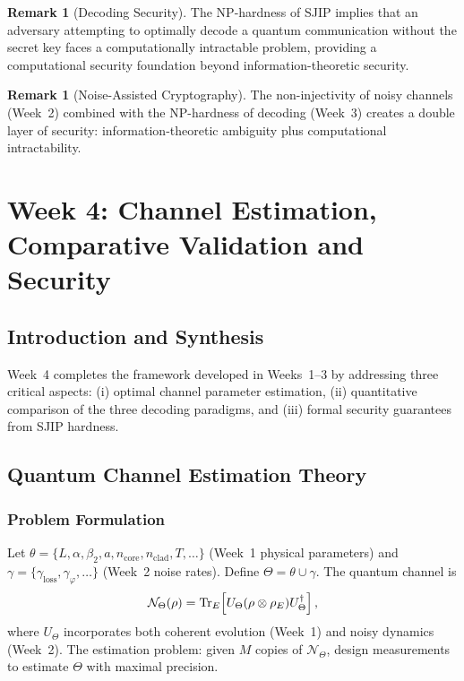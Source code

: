 \documentclass[12pt,a4paper]{article}
\theoremstyle{definition}
\newtheorem{remark}[definition]{Remark}
\theoremstyle{plain}
\newcommand{\tensor}{\otimes}
\begin{document}
\begin{remark}[Decoding Security]
The NP-hardness of SJIP implies that an adversary attempting to optimally decode a
quantum communication without the secret key faces a computationally intractable
problem, providing a computational security foundation beyond information-theoretic
security.
\end{remark}

\begin{remark}[Noise-Assisted Cryptography]
The non-injectivity of noisy channels (Week~2) combined with the NP-hardness of
decoding (Week~3) creates a double layer of security: information-theoretic ambiguity
plus computational intractability.
\end{remark}

\section{Week 4: Channel Estimation, Comparative Validation and Security}

\subsection{Introduction and Synthesis}

Week~4 completes the framework developed in Weeks~1--3 by addressing three critical
aspects: (i) optimal channel parameter estimation, (ii) quantitative comparison of the
three decoding paradigms, and (iii) formal security guarantees from SJIP hardness.

\subsection{Quantum Channel Estimation Theory}
\label{sec:week4_estimation}

\subsubsection{Problem Formulation}

Let $\theta=\{L,\alpha,\beta_2,a,n_{\mathrm{core}},n_{\mathrm{clad}},T,\dots\}$ (Week~1
physical parameters) and $\gamma=\{\gamma_{\mathrm{loss}},\gamma_\varphi,\dots\}$ (Week~2
noise rates). Define $\Theta=\theta\cup\gamma$. The quantum channel is
\begin{equation}
\mathcal{N}_\Theta(\rho)=\Tr_E\!\left[U_\Theta(\rho\tensor\rho_E)U_\Theta^\dagger\right],
\end{equation}
where $U_\Theta$ incorporates both coherent evolution (Week~1) and noisy dynamics
(Week~2). The estimation problem: given $M$ copies of $\mathcal{N}_\Theta$, design
measurements to estimate $\Theta$ with maximal precision.
\end{document}
